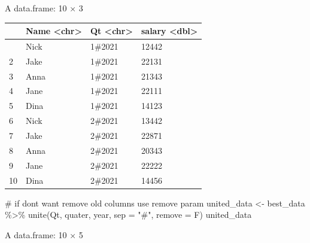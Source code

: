 \documentclass[
  letterpaper,
  DIV=11,
  numbers=noendperiod]{scrreprt}
\newenvironment{Shaded}{\begin{snugshade}}{\end{snugshade}}
\newcommand{\AttributeTok}[1]{\textcolor[rgb]{0.40,0.45,0.13}{#1}}
\newcommand{\CommentTok}[1]{\textcolor[rgb]{0.37,0.37,0.37}{#1}}
\newcommand{\FunctionTok}[1]{\textcolor[rgb]{0.28,0.35,0.67}{#1}}
\newcommand{\NormalTok}[1]{\textcolor[rgb]{0.00,0.23,0.31}{#1}}
\newcommand{\OtherTok}[1]{\textcolor[rgb]{0.00,0.23,0.31}{#1}}
\newcommand{\SpecialCharTok}[1]{\textcolor[rgb]{0.37,0.37,0.37}{#1}}
\newcommand{\StringTok}[1]{\textcolor[rgb]{0.13,0.47,0.30}{#1}}
\begin{document}
A data.frame: 10 × 3

\begin{longtable}[]{@{}llll@{}}
\toprule\noalign{}
& Name \textless chr\textgreater{} & Qt \textless chr\textgreater{} &
salary \textless dbl\textgreater{} \\
\midrule\noalign{}
\endhead
\bottomrule\noalign{}
\endlastfoot
1 & Nick & 1\#2021 & 12442 \\
2 & Jake & 1\#2021 & 22131 \\
3 & Anna & 1\#2021 & 21343 \\
4 & Jane & 1\#2021 & 22111 \\
5 & Dina & 1\#2021 & 14123 \\
6 & Nick & 2\#2021 & 13442 \\
7 & Jake & 2\#2021 & 22871 \\
8 & Anna & 2\#2021 & 20343 \\
9 & Jane & 2\#2021 & 22222 \\
10 & Dina & 2\#2021 & 14456 \\
\end{longtable}

\begin{Shaded}
\begin{Highlighting}[]
\CommentTok{\# if dont want remove old columns use remove param}
\NormalTok{united\_data }\OtherTok{\textless{}{-}}\NormalTok{ best\_data }\SpecialCharTok{\%\textgreater{}\%}
                \FunctionTok{unite}\NormalTok{(Qt, quater, year, }\AttributeTok{sep =} \StringTok{"\#"}\NormalTok{, }\AttributeTok{remove =}\NormalTok{ F)}
\NormalTok{united\_data}
\end{Highlighting}
\end{Shaded}

A data.frame: 10 × 5
\end{document}

